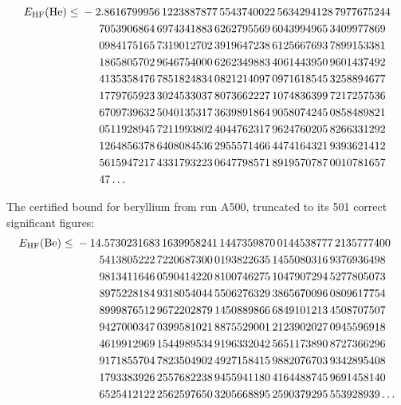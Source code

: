 \[\begin{aligned}E_\mathrm{HF}(\mathrm{He})\le{}&-2.
8616799956\,1223887877\,5543740022\,5634294128\,7977675244\\ &\hphantom{-2.}7053906864\,6974341883\,6262795569\,6043994965\,3409977869\\ &\hphantom{-2.}0984175165\,7319012702\,3919647238\,6125667693\,7899153381\\ &\hphantom{-2.}1865805702\,9646754000\,6262349883\,4061443950\,9601437492\\ &\hphantom{-2.}4135358476\,7851824834\,0821214097\,0971618545\,3258894677\\ &\hphantom{-2.}1779765923\,3024533037\,8073662227\,1074836399\,7217257536\\ &\hphantom{-2.}6709739632\,5040135317\,3639891864\,9058074245\,0858489821\\ &\hphantom{-2.}0511928945\,7211993802\,4044762317\,9624760205\,8266331292\\ &\hphantom{-2.}1264856378\,6408084536\,2955571466\,4474164321\,9393621412\\ &\hphantom{-2.}5615947217\,4331793223\,0647798571\,8919570787\,0010781657\\ &\hphantom{-2.}47\ldots\end{aligned}\]

The certified bound for beryllium from run A500, truncated to its 501 correct significant figures:
\[\begin{aligned}E_\mathrm{HF}(\mathrm{Be})\le{}&-14.
5730231683\,1639958241\,1447359870\,0144538777\,2135777400\\ &\hphantom{-14.}5413805222\,7220687300\,0193822635\,1455080316\,9376936498\\ &\hphantom{-14.}9813411646\,0590414220\,8100746275\,1047907294\,5277805073\\ &\hphantom{-14.}8975228184\,9318054044\,5506276329\,3865670096\,0809617754\\ &\hphantom{-14.}8999876512\,9672202879\,1450889866\,6849101213\,4508707507\\ &\hphantom{-14.}9427000347\,0399581021\,8875529001\,2123902027\,0945596918\\ &\hphantom{-14.}4619912969\,1544989534\,9196332042\,5651173890\,8727366296\\ &\hphantom{-14.}9171855704\,7823504902\,4927158415\,9882076703\,9342895408\\ &\hphantom{-14.}1793383926\,2557682238\,9455941180\,4164488745\,9691458140\\ &\hphantom{-14.}6525412122\,2562597650\,3205668895\,2590379295\,553928939\ldots\end{aligned}\]

